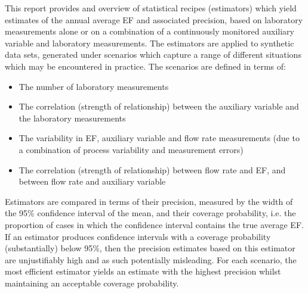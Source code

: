 This report provides and overview of statistical recipes (estimators) which yield estimates of the annual average EF and associated precision, based on laboratory measurements alone or on a combination of a continuously monitored auxiliary variable and laboratory measurements. The estimators are applied to synthetic data sets, generated under scenarios which capture a range of different situations which may be encountered in practice. The scenarios are defined in terms of: 
\begin{itemize}
	\item The number of laboratory measurements
	\item The correlation (strength of relationship) between the auxiliary variable and the laboratory measurements
	\item The variability in EF, auxiliary variable and flow rate measurements (due to a combination of process variability and measurement errors)
	\item The correlation (strength of relationship) between flow rate and EF, and between flow rate and auxiliary variable
\end{itemize} 

Estimators are compared in terms of their precision, measured by the width of the 95\% confidence interval of the mean, and their coverage probability, i.e. the proportion of cases in which the confidence interval contains the true average EF. If an estimator produces confidence intervals with a coverage probability (substantially) below 95\%, then the  precision estimates based on this estimator are unjustifiably high and as such potentially misleading. For each scenario, the most efficient estimator yields an estimate with the highest precision whilst maintaining an acceptable coverage probability. 
